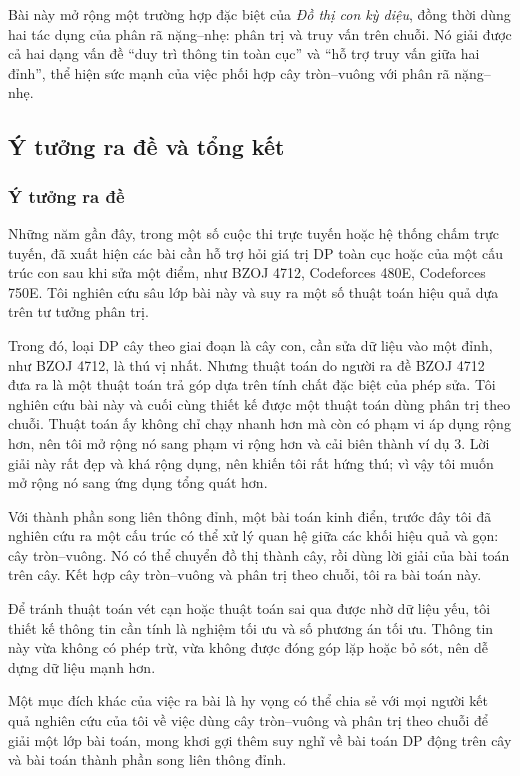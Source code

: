 \documentclass[11pt]{article}
\begin{document}
Bài này mở rộng một trường hợp đặc biệt của \emph{Đồ thị con kỳ diệu}, đồng
thời dùng hai tác dụng của phân rã nặng--nhẹ: phân trị và truy vấn trên chuỗi.
Nó giải được cả hai dạng vấn đề ``duy trì thông tin toàn cục'' và ``hỗ trợ
truy vấn giữa hai đỉnh'', thể hiện sức mạnh của việc phối hợp cây tròn--vuông
với phân rã nặng--nhẹ.

\subsection{Ý tưởng ra đề và tổng kết}

\subsubsection{Ý tưởng ra đề}

Những năm gần đây, trong một số cuộc thi trực tuyến hoặc hệ thống chấm trực
tuyến, đã xuất hiện các bài cần hỗ trợ hỏi giá trị DP toàn cục hoặc của một
cấu trúc con sau khi sửa một điểm, như BZOJ 4712, Codeforces 480E,
Codeforces 750E. Tôi nghiên cứu sâu lớp bài này và suy ra một số thuật toán
hiệu quả dựa trên tư tưởng phân trị.

Trong đó, loại DP cây theo giai đoạn là cây con, cần sửa dữ liệu vào một đỉnh,
như BZOJ 4712, là thú vị nhất. Nhưng thuật toán do người ra đề BZOJ 4712 đưa
ra là một thuật toán trả góp dựa trên tính chất đặc biệt của phép sửa. Tôi
nghiên cứu bài này và cuối cùng thiết kế được một thuật toán dùng phân trị
theo chuỗi. Thuật toán ấy không chỉ chạy nhanh hơn mà còn có phạm vi áp dụng
rộng hơn, nên tôi mở rộng nó sang phạm vi rộng hơn và cải biên thành ví dụ 3.
Lời giải này rất đẹp và khá rộng dụng, nên khiến tôi rất hứng thú; vì vậy tôi
muốn mở rộng nó sang ứng dụng tổng quát hơn.

Với thành phần song liên thông đỉnh, một bài toán kinh điển, trước đây tôi đã
nghiên cứu ra một cấu trúc có thể xử lý quan hệ giữa các khối hiệu quả và gọn:
cây tròn--vuông. Nó có thể chuyển đồ thị thành cây, rồi dùng lời giải của bài
toán trên cây. Kết hợp cây tròn--vuông và phân trị theo chuỗi, tôi ra bài toán
này.

Để tránh thuật toán vét cạn hoặc thuật toán sai qua được nhờ dữ liệu yếu, tôi
thiết kế thông tin cần tính là nghiệm tối ưu và số phương án tối ưu. Thông tin
này vừa không có phép trừ, vừa không được đóng góp lặp hoặc bỏ sót, nên dễ
dựng dữ liệu mạnh hơn.

Một mục đích khác của việc ra bài là hy vọng có thể chia sẻ với mọi người kết
quả nghiên cứu của tôi về việc dùng cây tròn--vuông và phân trị theo chuỗi để
giải một lớp bài toán, mong khơi gợi thêm suy nghĩ về bài toán DP động trên
cây và bài toán thành phần song liên thông đỉnh.
\end{document}
